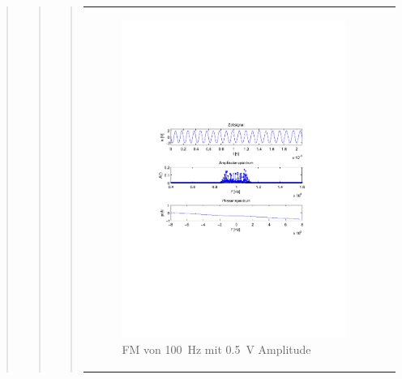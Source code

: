 \begin{quote}
\begin{quote}
\begin{quote}
\begin{center}
\begin{tabular}{ll}
                \begin{minipage}{0.6\textwidth}
                    \begin{figure}[H]
                        \includegraphics[scale=0.7, trim = 35mm 100mm 35mm 95mm, clip]{Bilder/f100_05}
                        \caption{FM von \SI{100}{\hertz} mit \SI{0,5}{\volt} Amplitude}
                        \label{fig:f100_1}
                    \end{figure}
                \end{minipage}
            
            \end{tabular}
            \end{center}
            

\end{quote}
\end{quote}
\end{quote}
